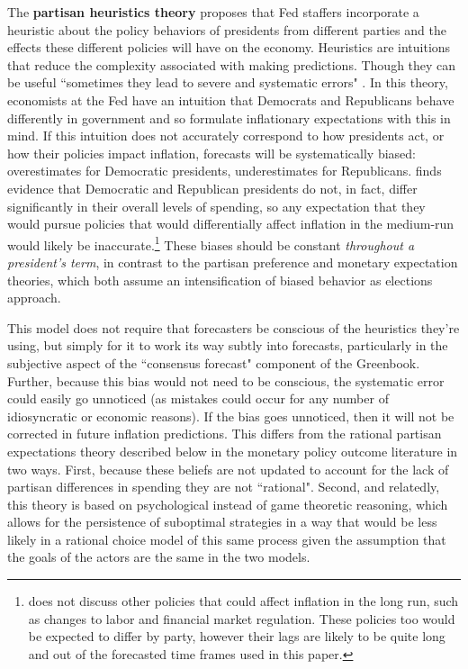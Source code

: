 \documentclass[a4paper]{article}\usepackage{graphicx, color}
\begin{document}
The {\bf{partisan heuristics theory}} proposes that Fed staffers incorporate a heuristic \citep[see][]{kahneman1973, tverskykahneman1974, kahneman2003} about the policy behaviors of presidents from different parties and the effects these different policies will have on the economy. Heuristics are intuitions that reduce the complexity associated with making predictions. Though they can be useful ``sometimes they lead to severe and systematic errors" \citep[][1124]{tverskykahneman1974}. In this theory, economists at the Fed have an intuition that Democrats and Republicans behave differently in government and so formulate inflationary expectations with this in mind. If this intuition does not accurately correspond to how presidents act, or how their policies impact inflation, forecasts will be systematically biased: overestimates for Democratic presidents, underestimates for Republicans. \cite{Bartels2008} finds evidence that Democratic and Republican presidents do not, in fact, differ significantly in their overall levels of spending, so any expectation that they would pursue policies that would differentially affect inflation in the medium-run would likely be inaccurate.\footnote{\cite{Bartels2008} does not discuss other policies that could affect inflation in the long run, such as changes to labor and financial market regulation. These policies too would be expected to differ by party, however their lags are likely to be quite long and out of the forecasted time frames used in this paper.} These biases should be constant {\emph{throughout a president's term}}, in contrast to the partisan preference and monetary expectation theories, which both assume an intensification of biased behavior as elections approach.

This model does not require that forecasters be conscious of the heuristics they're using, but simply for it to work its way subtly into forecasts, particularly in the subjective aspect of the ``consensus forecast" component of the Greenbook. Further, because this bias would not need to be conscious, the systematic error could easily go unnoticed (as mistakes could occur for any number of idiosyncratic or economic reasons). If the bias goes unnoticed, then it will not be corrected in future inflation predictions. This differs from the rational partisan expectations theory described below in the monetary policy outcome literature in two ways. First, because these beliefs are not updated to account for the lack of partisan differences in spending they are not ``rational". Second, and relatedly, this theory is based on psychological instead of game theoretic reasoning, which allows for the persistence of suboptimal strategies in a way that would be less likely in a rational choice model of this same process given the assumption that the goals of the actors are the same in the two models. 
\end{document}
